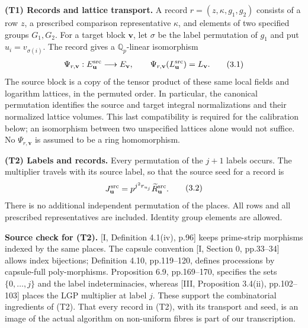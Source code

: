 \documentclass[11pt,a4paper]{amsart}
\begin{document}
\textbf{(T1) Records and lattice transport.} A record $r=(z,\kappa,g_1,g_2)$ consists of a row $z$, a prescribed comparison representative $\kappa$, and elements of two specified groups $G_1,G_2$. For a target block $\mathbf v$, let $\sigma$ be the label permutation of $g_1$ and put $u_i=v_{\sigma(i)}$. The record gives a $\mathbb Q_p$-linear isomorphism
\begin{equation}
\begin{gathered}
\Psi_{r,\mathbf v}:E^{\rm src}_{\mathbf u}\longrightarrow E_{\mathbf v},\qquad
\Psi_{r,\mathbf v}(L^{\rm src}_{\mathbf u})=L_{\mathbf v}.
\end{gathered}
\tag{3.1}\label{eq:3.1}
\end{equation}
The source block is a copy of the tensor product of these same local fields and logarithm lattices, in the permuted order. In particular, the canonical permutation identifies the source and target integral normalizations and their normalized lattice volumes. This last compatibility is required for the calibration below; an isomorphism between two unspecified lattices alone would not suffice. No $\Psi_{r,\mathbf v}$ is assumed to be a ring homomorphism.


\textbf{(T2) Labels and records.} Every permutation of the $j+1$ labels occurs. The multiplier travels with its source label, so that the source seed for a record is
\begin{equation}
\begin{gathered}
J^{\rm src}_{\mathbf u}=p^{j^2r_{u_j}}\widetilde R^{\rm src}_{\mathbf u}.
\end{gathered}
\tag{3.2}\label{eq:3.2}
\end{equation}
There is no additional independent permutation of the places. All rows and all prescribed representatives are included. Identity group elements are allowed.


\textbf{Source check for (T2).} [I, Definition 4.1(iv), p.96] keeps prime-strip morphisms indexed by the same places. The capsule convention [I, Section 0, pp.33--34] allows index bijections; Definition 4.10, pp.119--120, defines processions by capsule-full poly-morphisms. Proposition 6.9, pp.169--170, specifies the sets $\{0,\ldots,j\}$ and the label indeterminacies, whereas [III, Proposition 3.4(ii), pp.102--103] places the LGP multiplier at label $j$. These support the combinatorial ingredients of (T2). That every record in (T2), with its transport and seed, is an image of the actual algorithm on non-uniform fibres is part of our transcription.
\end{document}
